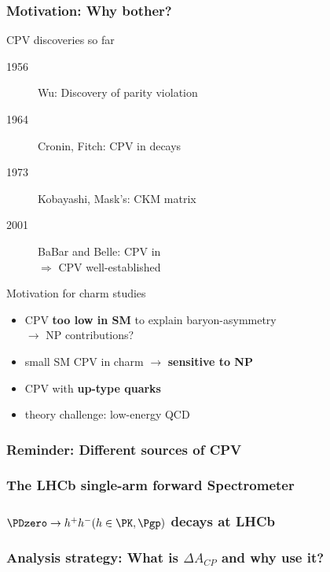 \documentclass[18pt, aspectratio=169]{beamer}
\newcommand{\kitemph}[1]{\textcolor{kit-green100}{\bf{#1}}}
\begin{document}
\begin{frame}
  \frametitle{Motivation: Why bother?}
  \begin{block}{CPV discoveries so far}
    \begin{description}
    \item[1956] Wu: Discovery of parity violation
    \item[1964] Cronin, Fitch: CPV in \PK decays
    \item[1973] Kobayashi, Mask's: CKM matrix
    \item[2001] BaBar and Belle: CPV in \PBzero\\
      $\Rightarrow$ CPV well-established
    \end{description}
  \end{block}
  \pause
  \begin{exampleblock}{Motivation for charm studies}
    \begin{itemize}
    \item CPV \kitemph{too low in SM} to explain baryon-asymmetry\\
      $\rightarrow$ NP contributions?
    \item small SM CPV in charm $\rightarrow$ \kitemph{sensitive to NP}
    \item CPV with \kitemph{up-type quarks}
    \item theory challenge: low-energy QCD
    \end{itemize}

  \end{exampleblock}
\end{frame}

\begin{frame}
  \frametitle{Reminder: Different sources of CPV}

\end{frame}

\begin{frame}
  \frametitle{The LHCb single-arm forward Spectrometer}

\end{frame}

\begin{frame}
  \frametitle{$\PDzero \rightarrow h^+h^- (h \in {\PK, \Pgp})$ decays at LHCb}

\end{frame}

\begin{frame}
  \frametitle{Analysis strategy: What is $\Delta A_{CP}$ and why use it?}

\end{frame}
\end{document}
